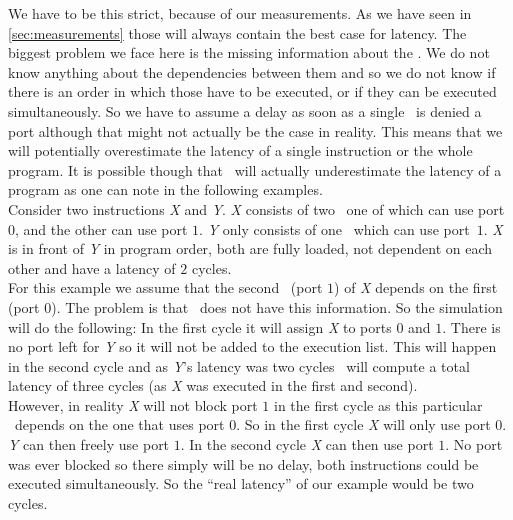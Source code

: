 We have to be this strict, because of our measurements. As we have seen in \autoref{sec:measurements} those will always contain the best case for latency. The biggest problem we face here is the missing information about the \microops. We do not know anything about the dependencies between them and so we do not know if there is an order in which those have to be executed, or if they can be executed simultaneously. So we have to assume a delay as soon as a single \microop\ is denied a port although that might not actually be the case in reality. This means that we will potentially overestimate the latency of a single instruction or the whole program. It is possible though that \suaca\ will actually underestimate the latency of a program as one can note in the following examples.\\


Consider two instructions \emph{X} and \emph{Y}. \emph{X} consists of two \microops\, one of which can use port $0$, and the other can use port $1$. \emph{Y} only consists of one \microop\ which can use port~$1$. \emph{X} is in front of \emph{Y} in program order, both are fully loaded, not dependent on each other and have a latency of $2$ cycles.\\
For this example we assume that the second \microop\ (port $1$) of \emph{X} depends on the first (port $0$). The problem is that \suaca\ does not have this information. So the simulation will do the following: In the first cycle it will assign \emph{X} to ports $0$ and $1$. There is no port left for \emph{Y} so it will not be added to the execution list. This will happen in the second cycle and as \emph{Y}'s latency was two cycles \suaca\ will compute a total latency of three cycles (as \emph{X} was executed in the first and second).\\
However, in reality \emph{X} will not block port $1$ in the first cycle as this particular \microop\ depends on the one that uses port $0$. So in the first cycle \emph{X} will only use port $0$. \emph{Y} can then freely use port $1$. In the second cycle \emph{X} can then use port $1$. No port was ever blocked so there simply will be no delay, both instructions could be executed simultaneously. So the ``real latency'' of our example would be two cycles.\\

